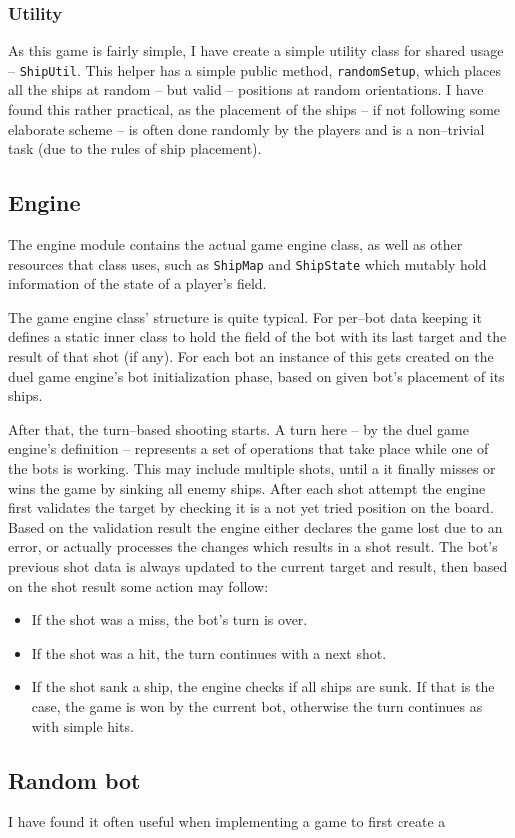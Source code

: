 \documentclass[11pt,a4paper,oneside]{report}
\newcommand{\code}{\texttt}
\begin{document}
			\subsubsection{Utility}
			
			As this game is fairly simple, I have create a simple utility class for shared usage -- \code{ShipUtil}. This helper has a simple public method, \code{randomSetup}, which places all the ships at random -- but valid -- positions at random orientations. I have found this rather practical, as the placement of the ships -- if not following some elaborate scheme -- is often done randomly by the players and is a non--trivial task (due to the rules of ship placement). 
		
		\subsection{Engine}		

		The engine module contains the actual game engine class, as well as other resources that class uses, such as \code{ShipMap} and \code{ShipState} which mutably hold information of the state of a player's field.

		The game engine class' structure is quite typical. For per--bot data keeping it defines a static inner class to hold the field of the bot with its last target and the result of that shot (if any). For each bot an instance of this gets created on the duel game engine's bot initialization phase, based on given bot's placement of its ships.
		
		After that, the turn--based shooting starts. A turn here -- by the duel game engine's definition -- represents a set of operations that take place while one of the bots is working. This may include multiple shots, until a it finally misses or wins the game by sinking all enemy ships. After each shot attempt the engine first validates the target by checking it is a not yet tried position on the board. Based on the validation result the engine either declares the game lost due to an error, or actually processes the changes which results in a shot result. The bot's previous shot data is always updated to the current target and result, then based on the shot result some action may follow: 
		
		\begin{itemize}
		
			\item If the shot was a miss, the bot's turn is over.
			
			\item If the shot was a hit, the turn continues with a next shot.
			
			\item If the shot sank a ship, the engine checks if all ships are sunk. If that is the case, the game is won by the current bot, otherwise the turn continues as with simple hits.
		
		\end{itemize}

		\subsection{Random bot}
		
		I have found it often useful when implementing a game to first create a 
\end{document}
